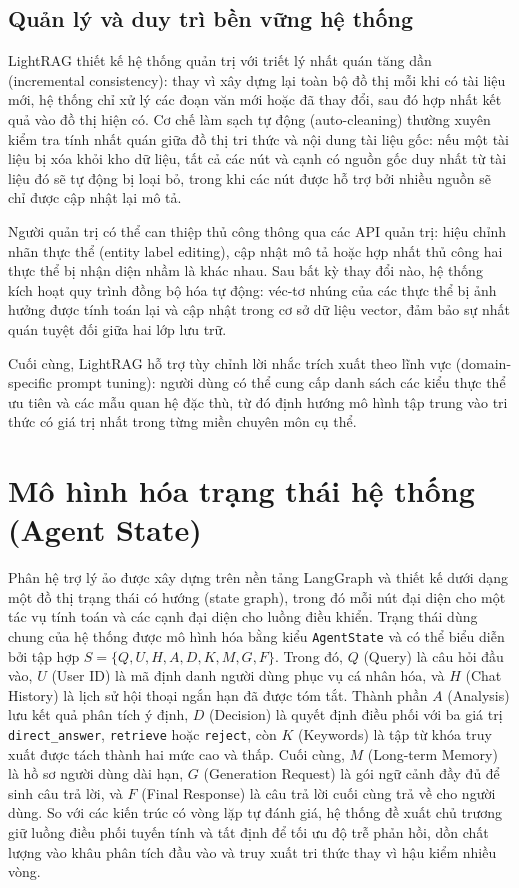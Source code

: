 \subsection{Quản lý và duy trì bền vững hệ thống}

\indent LightRAG thiết kế hệ thống quản trị với triết lý nhất quán tăng dần (incremental consistency): thay vì xây dựng lại toàn bộ đồ thị mỗi khi có tài liệu mới, hệ thống chỉ xử lý các đoạn văn mới hoặc đã thay đổi, sau đó hợp nhất kết quả vào đồ thị hiện có. Cơ chế làm sạch tự động (auto-cleaning) thường xuyên kiểm tra tính nhất quán giữa đồ thị tri thức và nội dung tài liệu gốc: nếu một tài liệu bị xóa khỏi kho dữ liệu, tất cả các nút và cạnh có nguồn gốc duy nhất từ tài liệu đó sẽ tự động bị loại bỏ, trong khi các nút được hỗ trợ bởi nhiều nguồn sẽ chỉ được cập nhật lại mô tả.

\indent Người quản trị có thể can thiệp thủ công thông qua các API quản trị: hiệu chỉnh nhãn thực thể (entity label editing), cập nhật mô tả hoặc hợp nhất thủ công hai thực thể bị nhận diện nhầm là khác nhau. Sau bất kỳ thay đổi nào, hệ thống kích hoạt quy trình đồng bộ hóa tự động: véc-tơ nhúng của các thực thể bị ảnh hưởng được tính toán lại và cập nhật trong cơ sở dữ liệu vector, đảm bảo sự nhất quán tuyệt đối giữa hai lớp lưu trữ.

\indent Cuối cùng, LightRAG hỗ trợ tùy chỉnh lời nhắc trích xuất theo lĩnh vực (domain-specific prompt tuning): người dùng có thể cung cấp danh sách các kiểu thực thể ưu tiên và các mẫu quan hệ đặc thù, từ đó định hướng mô hình tập trung vào tri thức có giá trị nhất trong từng miền chuyên môn cụ thể.

\section{Mô hình hóa trạng thái hệ thống (Agent State)}
Phân hệ trợ lý ảo được xây dựng trên nền tảng LangGraph và thiết kế dưới dạng một đồ thị trạng thái có hướng (state graph), trong đó mỗi nút đại diện cho một tác vụ tính toán và các cạnh đại diện cho luồng điều khiển. Trạng thái dùng chung của hệ thống được mô hình hóa bằng kiểu \texttt{AgentState} và có thể biểu diễn bởi tập hợp $S = \{Q, U, H, A, D, K, M, G, F\}$. Trong đó, $Q$ (Query) là câu hỏi đầu vào, $U$ (User ID) là mã định danh người dùng phục vụ cá nhân hóa, và $H$ (Chat History) là lịch sử hội thoại ngắn hạn đã được tóm tắt. Thành phần $A$ (Analysis) lưu kết quả phân tích ý định, $D$ (Decision) là quyết định điều phối với ba giá trị \texttt{direct\_answer}, \texttt{retrieve} hoặc \texttt{reject}, còn $K$ (Keywords) là tập từ khóa truy xuất được tách thành hai mức cao và thấp. Cuối cùng, $M$ (Long-term Memory) là hồ sơ người dùng dài hạn, $G$ (Generation Request) là gói ngữ cảnh đầy đủ để sinh câu trả lời, và $F$ (Final Response) là câu trả lời cuối cùng trả về cho người dùng. So với các kiến trúc có vòng lặp tự đánh giá, hệ thống đề xuất chủ trương giữ luồng điều phối tuyến tính và tất định để tối ưu độ trễ phản hồi, dồn chất lượng vào khâu phân tích đầu vào và truy xuất tri thức thay vì hậu kiểm nhiều vòng.

